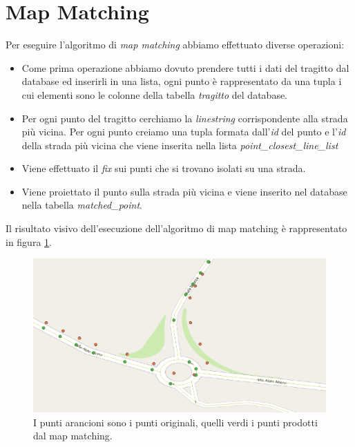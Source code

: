 \documentclass[12pt]{report}
\begin{document}
\chapter*{Map Matching}
Per eseguire l'algoritmo di \textit{map matching} abbiamo effettuato diverse operazioni:
\begin{itemize}
	\item Come prima operazione abbiamo dovuto prendere tutti i dati del tragitto dal database ed inserirli in una lista, ogni punto è rappresentato da una tupla i cui elementi sono le colonne della tabella \textit{tragitto} del database. 
	\item Per ogni punto del tragitto cerchiamo la \textit{linestring} corrispondente alla strada più vicina. Per ogni punto creiamo una tupla formata dall'\textit{id} del punto e l'\textit{id} della strada più vicina che viene inserita nella lista \textit{point\_closest\_line\_list} 
	\item Viene effettuato il \textit{fix} sui punti che si trovano isolati su una strada. 
	\item Viene proiettato il punto sulla strada più vicina e viene inserito nel database nella tabella \textit{matched\_point}.
	
\end{itemize}
Il risultato visivo dell'esecuzione dell'algoritmo di map matching è rappresentato in figura \ref{mapmatching}.
\begin{figure}
	\centering
	\includegraphics[scale = 0.43]{figures/mm}
	\caption{I punti arancioni sono i punti originali, quelli verdi i punti prodotti dal map matching.}\label{mapmatching}
\end{figure}
	
\end{document}
